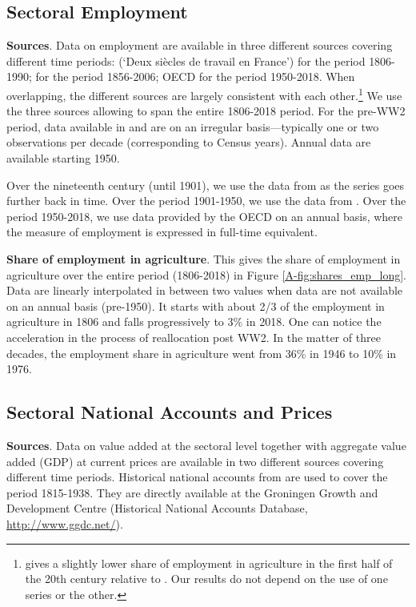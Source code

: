\documentclass[11pt]{report}
\begin{document}
\subsection{Sectoral Employment}\label{A-sec:sectoral-employment}

\textbf{Sources}. Data on employment are available in three different sources covering different time periods: \cite{marchand1991deux} (`Deux siècles de travail en France') for the period 1806-1990; \cite{herrendorf2014growth} for the period 1856-2006; OECD for the period 1950-2018. When overlapping, the different sources are largely consistent with each other.\footnote{\cite{marchand1991deux} gives a slightly lower share of employment in agriculture in the first half of the 20th century relative to \cite{herrendorf2014growth}. Our results do not depend on the use of one series or the other.} We use the three sources allowing to span the entire 1806-2018 period. For the pre-WW2 period, data available in \cite{marchand1991deux} and \cite{herrendorf2014growth} are on an irregular basis---typically one or two observations per decade (corresponding to Census years). Annual data are available starting 1950.

Over the nineteenth century (until 1901), we use the data from \cite{marchand1991deux} as the series goes further back in time. Over the period 1901-1950, we use the data from \cite{herrendorf2014growth}. Over the period 1950-2018, we use data provided by the OECD on an annual basis, where the measure of employment is expressed in full-time equivalent. 

\textbf{Share of employment in agriculture}. This gives the share of employment in agriculture over the entire period (1806-2018) in Figure \ref{A-fig:shares_emp_long}. Data are linearly interpolated in between two values when data are not available on an annual basis (pre-1950). It starts with about 2/3 of the employment in agriculture in 1806 and falls progressively to 3\% in 2018. One can notice the acceleration in the process of reallocation post WW2. In the matter of three decades, the employment share in agriculture went from 36\% in 1946 to 10\% in 1976. 



\subsection{Sectoral National Accounts and Prices}\label{A-sec:national-accounts} 

\textbf{Sources}. Data on value added at the sectoral level together with aggregate value added (GDP) at current prices are available in two different sources covering different time periods. Historical national accounts from \cite{toutain1987produit} are used to cover the period 1815-1938. They are directly available at the Groningen Growth and Development Centre (Historical National Accounts Database, \url{http://www.ggdc.net/}). 
\end{document}
